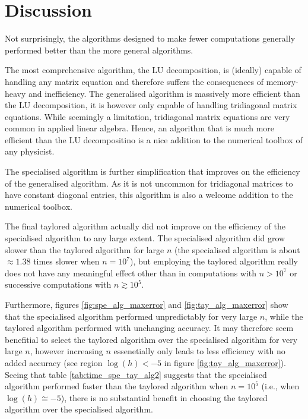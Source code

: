 \documentclass[reprint,english]{revtex4-1}
\begin{document}
\section{Discussion}
Not surprisingly, the algorithms designed to make fewer computations generally performed better than the more general algorithms.

The most comprehensive algorithm, the LU decomposition, is (ideally) capable of handling any matrix equation and therefore suffers the consequences of memory-heavy and inefficiency. The generalised algorithm is massively more efficient than the LU decomposition, it is however only capable of handling tridiagonal matrix equations. While seemingly a limitation, tridiagonal matrix equations are very common in applied linear algebra. Hence, an algorithm that is much more efficient than the LU decompositino is a nice addition to the numerical toolbox of any physicist.

The specialised algorithm is further simplification that improves on the efficiency of the generalised algorithm. As it is not uncommon for tridiagonal matrices to have constant diagonal entries, this algorithm is also a welcome addition to the numerical toolbox.

The final taylored algorithm actually did not improve on the efficiency of the specialised algorithm to any large extent. The specialised algorithm did grow slower than the taylored algorithm for large \(n\) (the specialised algorithm is about \(\approx1.38\) times slower when \(n=10^7\)), but employing the taylored algorithm really does not have any meaningful effect other than in computations with \(n>10^7\) or successive computations with \(n\gtrsim10^5\).

Furthermore, figures \ref{fig:spe_alg_maxerror} and \ref{fig:tay_alg_maxerror} show that the specialised algorithm performed unpredictably for very large \(n\), while the taylored algorithm performed with unchanging accuracy. It may therefore seem benefitial to select the taylored algorithm over the specialised algorithm for very large \(n\), however increasing \(n\) essenetially only leads to less efficiency with no added accuracy (see region \(\log(h)<-5\) in figure \ref{fig:tay_alg_maxerror}). Seeing that table \ref{tab:time_spe_tay_alg2} suggests that the specialised algorithm performed faster than the taylored algorithm when \(n=10^5\) (i.e., when \(\log(h)\cong-5\)), there is no substantial benefit in choosing the taylored algorithm over the specialised algorithm.
\clearpage
\end{document}
